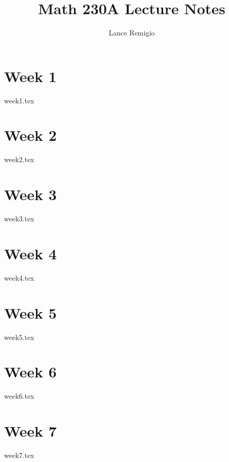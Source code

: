 \documentclass{report}
\title{Math 230A Lecture Notes}
\author{Lance Remigio}
\begin{document}
\maketitle 
\tableofcontents


\chapter{Week 1}

{week1.tex}

\chapter{Week 2}

{week2.tex}

\chapter{Week 3}

{week3.tex}

\chapter{Week 4}

{week4.tex}

\chapter{Week 5}

{week5.tex}

\chapter{Week 6}

{week6.tex}

\chapter{Week 7}

{week7.tex}
\end{document}
